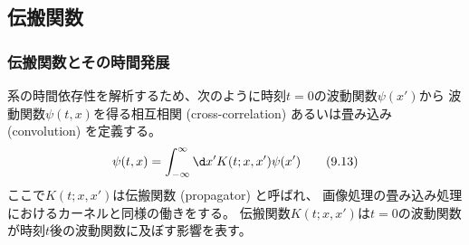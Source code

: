 \subsection{伝搬関数}

\subsubsection{伝搬関数とその時間発展}

系の時間依存性を解析するため、次のように時刻$t=0$の波動関数$\psi(x')$から
波動関数$\psi(t,x)$を得る相互相関 (cross-correlation)
あるいは畳み込み (convolution) を定義する。
\begin{equation}
  \psi(t,x)
  =\int_{-\infty}^\infty\d x'
  K(t;x,x')\psi(x')
  \tag{9.13}
\end{equation}
ここで$K(t;x,x')$は伝搬関数 (propagator) と呼ばれ、
画像処理の畳み込み処理におけるカーネルと同様の働きをする。
伝搬関数$K(t;x,x')$は$t=0$の波動関数が時刻$t$後の波動関数に及ぼす影響を表す。

